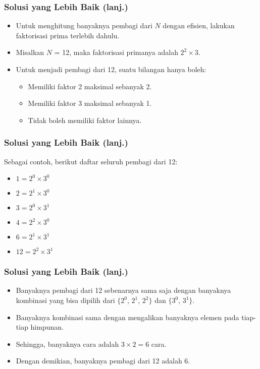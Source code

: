 \begin{frame}
\frametitle{Solusi yang Lebih Baik (lanj.)}
\begin{itemize}
  \item Untuk menghitung banyaknya pembagi dari $N$ dengan efisien, lakukan faktorisasi prima terlebih dahulu.
  \item Misalkan $N$ = 12, maka faktorisasi primanya adalah $2^2 \times 3$.
  \item Untuk menjadi pembagi dari 12, suatu bilangan hanya boleh:
  \begin{itemize}
    \item Memiliki faktor 2 maksimal sebanyak 2.
    \item Memiliki faktor 3 maksimal sebanyak 1.
    \item Tidak boleh memiliki faktor lainnya.
  \end{itemize}
\end{itemize}
\end{frame}

\begin{frame}
\frametitle{Solusi yang Lebih Baik (lanj.)}
Sebagai contoh, berikut daftar seluruh pembagi dari 12:
\begin{itemize}
  \item $1 = 2^0 \times 3^0$
  \item $2 = 2^1 \times 3^0$
  \item $3 = 2^0 \times 3^1$
  \item $4 = 2^2 \times 3^0$
  \item $6 = 2^1 \times 3^1$
  \item $12 = 2^2 \times 3^1$
\end{itemize}
\end{frame}

\begin{frame}
\frametitle{Solusi yang Lebih Baik (lanj.)}
\begin{itemize}
  \item Banyaknya pembagi dari 12 sebenarnya sama saja dengan banyaknya kombinasi yang bisa dipilih dari $\lbrace 2^0$, $2^1$, $2^2\rbrace $ dan $\lbrace 3^0$, $3^1\rbrace$.
  \item Banyaknya kombinasi sama dengan mengalikan banyaknya elemen pada tiap-tiap himpunan.
  \item Sehingga, banyaknya cara adalah $3 \times 2 = 6$ cara.
  \item Dengan demikian, banyaknya pembagi dari 12 adalah 6.
\end{itemize}
\end{frame}

